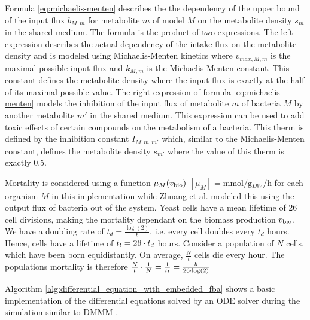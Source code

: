 Formula \ref{eq:michaelis-menten} describes the the dependency of the upper bound of the input flux $b_{M,m}$ for metabolite $m$ of model $M$ on the metabolite density
$s_m$ in the shared medium. The formula is the product of two expressions. The left expression describes the actual dependency
of the intake flux on the metabolite density and is modeled using Michaelis-Menten kinetics where $v_{max,M,m}$ is the maximal
possible input flux and $k_{M,m}$ is the Michaelis-Menten constant. This constant defines the metabolite density where the
input flux is exactly at the half of its maximal possible value. The right expression of formula \ref{eq:michaelis-menten}
models the inhibition of the input flux of metabolite $m$ of bacteria $M$ by another metabolite $m'$ in the shared medium.
This expression can be used to add toxic effects of certain compounds on the metabolism of a bacteria. This therm is defined
by the inhibition constant $I_{M,m,m'}$ which, similar to the Michaelis-Menten constant, defines the metabolite density $s_{m'}$
where the value of this therm is exactly 0.5.

Mortality is considered using a function $\mu_M(v_{\mathrm{bio}})$ $\left[ \mu_{M} \right] = \si{\milli\mole\per\gram_{DW}\per\hour}$ for each organism $M$ in this implementation while Zhuang et al. modeled this
using the output flux of bacteria out of the system.
Yeast cells have a mean lifetime of 26 cell divisions, making the mortality dependant on the biomass production $v_{\mathrm{bio}}$.
We have a doubling rate of $t_d=\frac{\log(2)}{b}$, i.e. every cell doubles every $t_d$ hours. Hence, cells have a lifetime of $t_l=26\cdot t_d$ hours.
Consider a population of $N$ cells, which have been born equidistantly. On average, $\frac{N}{t}$ cells die every hour.
The populations mortality is therefore $\frac{N}{t} \cdot \frac{1}{N}=\frac{1}{t_l}=\frac{b}{26\cdot \log(2)}$

Algorithm \ref{alg:differential_equation_with_embedded_fba} shows a basic implementation of the differential equations solved by an ODE
solver during the simulation similar to DMMM \cite{zhuang_genome-scale_2011}.


